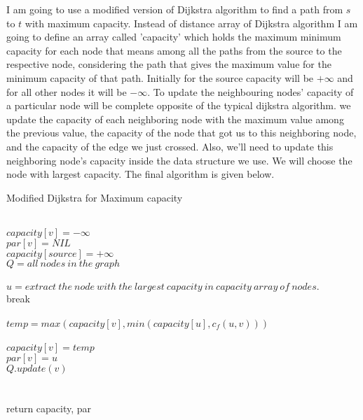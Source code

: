 I am going to use a modified version of Dijkstra algorithm to find a path from $s$ to $t$ with maximum capacity. Instead of distance array of Dijkstra algorithm I am going to define an array called 'capacity' which holds the maximum minimum capacity for each node that means among all the paths from the source to the respective node, considering the path that gives the maximum value for the minimum capacity of that path. Initially for the source capacity will be $+\infty$ and for all other nodes it will be $-\infty$. To update the neighbouring nodes' capacity of a particular node will be complete opposite of the typical dijkstra algorithm. we update the capacity of each neighboring node with the maximum value among the previous value, the capacity of the node that got us to this neighboring node, and the capacity of the edge we just crossed. Also, we’ll need to update this neighboring node’s capacity inside the data structure we use. We will choose the node with largest capacity. The final algorithm is given below.
\begin{algorithm}
\caption{Modified Dijkstra for Maximum capacity}
\begin{algorithmic}[1]
\\
\qquad    \STATE $capacity[v]=-\infty$\\
\qquad    \STATE $par[v]=NIL$
\EndFor\\
\STATE $capacity[source]=+\infty$\\
\STATE $Q= all\> nodes \> in\> the\> graph$\\
\\
\qquad \STATE $u= extract \> the \> node\> with\> the \> largest\> capacity\> in \>capacity\> array\> of\> nodes.$
\qquad {}\\
\qquad \qquad break
\qquad \EndIf\\
\qquad {}\\
\qquad \qquad  $temp = max(capacity[v], min(capacity[u], c_f(u, v)))$\\
\qquad\qquad {}\\
\qquad\qquad\qquad \STATE $capacity[v]= temp$\\
\qquad\qquad\qquad \STATE $par[v]=u$\\
\qquad\qquad\qquad \STATE $Q.update(v)$
\qquad\qquad \EndIf\\
\qquad \EndFor\\
\EndWhile\\
\STATE return capacity, par
\end{algorithmic}


\end{algorithm}


